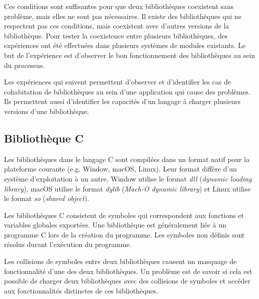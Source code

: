 
Ces conditions sont suffisantes pour que deux bibliothèques coexistent sans
problème, mais elles ne sont pas nécessaires. Il existe des bibliothèques qui
ne respectent pas ces conditions, mais coexistent avec d'autres versions de la
bibliothèque.
Pour tester la coexistence entre plusieurs bibliothèques, des expériences ont
été effectuées dans plusieurs systèmes de modules existants. Le but de
l'expérience est d'observer le bon fonctionnement des bibliothèques au sein
du processus.

Les expériences qui suivent permettent d'observer et d'identifier les cas de
cohabitation de bibliothèques au sein d'une application qui cause des
problèmes. Ils permettent aussi d'identifier les capacités d'un langage à
charger plusieurs versions d'une bibliothèque.



\subsection{Bibliothèque C}
%
Les bibliothèques dans le langage C sont compilées dans un format natif pour la
plateforme courante (e.g. Window, macOS, Linux). Leur format diffère d'un
système d'exploitation à un autre, Window utilise le format \textit{dll}
(\textit{dynamic loading library}), macOS utilise le format \textit{dylib}
(\textit{Mach-O dynamic library}) et Linux utilise le format \textit{so}
(\textit{shared object}).

Les bibliothèques C consistent de symboles qui correspondent aux fonctions et
variables globales exportées. Une bibliothèque est généralement liée à un
programme C lors de la création du programme. Les symboles non définis sont
résolus durant l'exécution du programme.

Les collisions de symboles entre deux bibliothèques causent un masquage de
fonctionnalité d'une des deux bibliothèques. Un problème est de savoir si cela
est possible de charger deux bibliothèques avec des collisions de symboles et
accéder aux fonctionnalités distinctes de ces bibliothèques.

